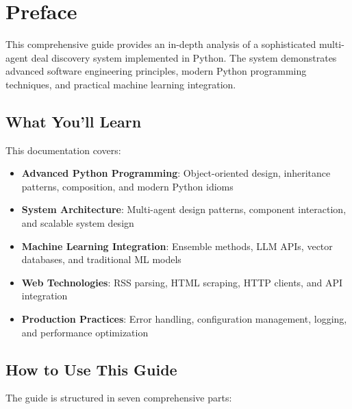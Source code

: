 \documentclass[12pt,twoside,openright]{book}
\begin{document}


\newpage
\tableofcontents
\newpage
\listoffigures
\newpage
\listoftables
\newpage
\lstlistoflistings


\chapter*{Preface}

This comprehensive guide provides an in-depth analysis of a sophisticated multi-agent deal discovery system implemented in Python. The system demonstrates advanced software engineering principles, modern Python programming techniques, and practical machine learning integration.

\section*{What You'll Learn}

This documentation covers:

\begin{itemize}
    \item \textbf{Advanced Python Programming}: Object-oriented design, inheritance patterns, composition, and modern Python idioms
    \item \textbf{System Architecture}: Multi-agent design patterns, component interaction, and scalable system design
    \item \textbf{Machine Learning Integration}: Ensemble methods, LLM APIs, vector databases, and traditional ML models
    \item \textbf{Web Technologies}: RSS parsing, HTML scraping, HTTP clients, and API integration
    \item \textbf{Production Practices}: Error handling, configuration management, logging, and performance optimization
\end{itemize}

\section*{How to Use This Guide}

The guide is structured in seven comprehensive parts:
\end{document}
